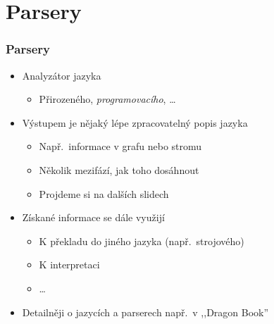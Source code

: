
\section{Parsery}
\frame{\sectionpage}

\begin{frame}
  \frametitle{Parsery}

  \begin{itemize}
    \item Analyzátor jazyka
    \begin{itemize}
      \item Přirozeného, \emph{programovacího}, \dots
    \end{itemize}

    \pause

    \item Výstupem je nějaký lépe zpracovatelný popis jazyka
    \begin{itemize}
      \item Např.\ informace v grafu nebo stromu
      \item Několik mezifází, jak toho dosáhnout
      \item Projdeme si na dalších slidech
    \end{itemize}

    \pause

    \item Získané informace se dále využijí
    \begin{itemize}
      \item K překladu do jiného jazyka (např.\ strojového)
      \item K interpretaci
      \item \dots
    \end{itemize}

    \pause

    \item Detailněji o jazycích a parserech např.\ v ,,Dragon Book''
  \end{itemize}

\end{frame}

